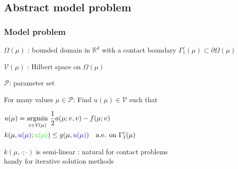 \documentclass[a4paper,10pt]{beamer}
\newcommand\gr[1]{\textcolor{green} {#1} }
\newcommand\bl[1]{\textcolor{blue} {#1} }
\begin{document}
\subsection{Abstract model problem}
\begin{frame}\frametitle{Model problem}
$\Omega(\mu)$ : bounded domain in $ \mathbb{R}^d$ with a contact boundary $\Gamma^c_1(\mu)\subset\partial\Omega(\mu)$

$\mathcal V(\mu)$ : Hilbert space on $\Omega(\mu)$

$\mathcal P$: parameter set

\medskip

For many values $\mu\in\mathcal P$: 
Find $u(\mu)\in\mathcal V$ such that
\begin{center}
\begin{tcolorbox}[colback=blue!5,colframe=black!50!cyan,width = .7\linewidth,halign = center]
$
\begin{alignedat}{2}
& u(\mu)=\underset{v \in \mathcal V(\mu)}{\mathrm{argmin}}\ \frac{1}{2}a(\mu;v,v)- f(\mu;v) \\
& k(\mu,\bl{u(\mu)};\gr{u(\mu)})\leq g(\mu,\bl{u(\mu)})\quad \text{a.e. on }\Gamma^c_1(\mu)
 \end{alignedat}
$
\end{tcolorbox}
\end{center}
$k(\mu,\cdot;\cdot)$ is semi-linear : natural for contact problems\\
\hspace{3.45cm} handy for iterative solution methods

\end{frame}
\end{document}
